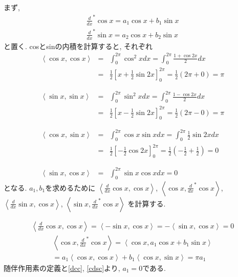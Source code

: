 \documentclass[a4paper,11pt]{jsarticle}
\begin{document}
\section{}
まず, 
\begin{eqnarray*}
  \frac{d}{dx}^*\cos{x} = a_1\cos{x} + b_1\sin{x} \\
  \frac{d}{dx}^*\sin{x} = a_2\cos{x} + b_2\sin{x}
\end{eqnarray*}
と置く. cosとsinの内積を計算すると, それぞれ
\begin{eqnarray*}
  \left<\cos{x}, \cos{x}\right> &=& \int_0^{2\pi}\cos^2{x}dx = \int_0^{2\pi}\frac{1+\cos{2x}}{2}dx \\
  &=& \frac{1}{2}\left[x + \frac{1}{2}\sin{2x}\right]_0^{2\pi}
  = \frac{1}{2}\left(2\pi + 0\right) = \pi \\
  \\\\
  \left<\sin{x}, \sin{x}\right> &=& \int_0^{2\pi}\sin^2{x}dx = \int_0^{2\pi}\frac{1-\cos{2x}}{2}dx \\
  &=& \frac{1}{2}\left[x - \frac{1}{2}\sin{2x}\right]_0^{2\pi}
  = \frac{1}{2}\left(2\pi - 0\right) = \pi \\
  \\\\
  \left<\cos{x}, \sin{x}\right> &=& \int_0^{2\pi}\cos{x}\sin{x}dx
    = \int_0^{2\pi}\frac{1}{2}\sin{2x}dx \\
  &=& \frac{1}{2}\left[-\frac{1}{2}\cos{2x}\right]_0^{2\pi}
  = \frac{1}{2}\left(-\frac{1}{2} + \frac{1}{2}\right) = 0 \\
  \\\\
  \left<\sin{x}, \cos{x}\right> &=& \int_0^{2\pi}\sin{x}\cos{x}dx = 0
\end{eqnarray*}
となる. $a_1, b_1$を求めるために 
$\left<\frac{d}{dx}\cos{x}, \cos{x}\right>$,
$\left<\cos{x}, \frac{d}{dx}^*\cos{x}\right>$,
$\left<\frac{d}{dx}\sin{x}, \cos{x}\right>$,
$\left<\sin{x}, \frac{d}{dx}^*\cos{x}\right>$
を計算する.

\begin{eqnarray}
  \left<\frac{d}{dx}\cos{x}, \cos{x}\right>
  = \left<-\sin{x}, \cos{x}\right>
  = -\left<\sin{x}, \cos{x}\right>
  = 0 \label{dcc}
\end{eqnarray}
\begin{equation}
  \begin{split}
    \left<\cos{x}, \frac{d}{dx}^*\cos{x}\right>
    = \left<\cos{x}, a_1\cos{x} + b_1\sin{x}\right> \\
    = a_1\left<\cos{x}, \cos{x}\right> + b_1\left<\cos{x}, \sin{x}\right>
    = \pi a_1
  \end{split}
  \label{cdsc}
\end{equation}
随伴作用素の定義と\eqref{dcc}, \eqref{cdsc}より, $a_1=0$である.
\end{document}
